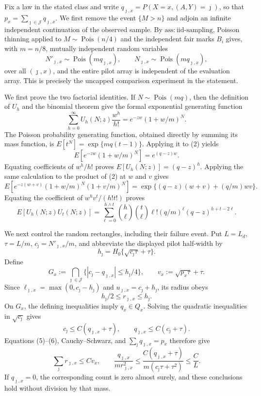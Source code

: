 Fix a law in the stated class and write \(q_{\jmath,x}=P(X=x,(A,Y)=\jmath)\), so that \(p_x=\sum_{\jmath\in\mathcal J}q_{\jmath,x}\).  We first remove the event \(\{M>n\}\) and adjoin an infinite independent continuation of the observed sample.  By \(\mathrm{ass:iid\text{-}sampling}\), Poisson thinning applied to \(M\sim\operatorname{Pois}(n/4)\) and the independent fair marks \(B_i\) gives, with \(m=n/8\), mutually independent random variables
\[
 N'_{\jmath,x}\sim\operatorname{Pois}(m q_{\jmath,x}),
 \qquad N_{\jmath,x}\sim\operatorname{Pois}(m q_{\jmath,x}),
 \tag{1}
\]
over all \((\jmath,x)\), and the entire pilot array is independent of the evaluation array.  This is precisely the uncapped comparison experiment in the statement.

We first prove the two factorial identities.  If \(N\sim\operatorname{Pois}(mq)\), then the definition of \(U_h\) and the binomial theorem give the formal exponential generating function
\[
 \sum_{h=0}^{\infty}U_h(N;z)\frac{w^h}{h!}
 =e^{-zw}(1+w/m)^N.
 \tag{2}
\]
The Poisson probability generating function, obtained directly by summing its mass function, is \(E[t^N]=\exp\{mq(t-1)\}\).  Applying it to (2) yields
\[
 E\!\left[e^{-zw}(1+w/m)^N\right]=e^{(q-z)w}.
\]
Equating coefficients of \(w^h/h!\) proves \(E[U_h(N;z)]=(q-z)^h\).  Applying the same calculation to the product of (2) at \(w\) and \(v\) gives
\[
 E\!\left[e^{-z(w+v)}(1+w/m)^N(1+v/m)^N\right]
 =\exp\{(q-z)(w+v)+(q/m)wv\}.
\]
Equating the coefficient of \(w^hv^t/(h!t!)\) proves
\[
 E[U_h(N;z)U_t(N;z)]
 =\sum_{\ell=0}^{h\wedge t}\binom h\ell\binom t\ell\ell!
 (q/m)^\ell(q-z)^{h+t-2\ell}.
 \tag{3}
\]

We next control the random rectangles, including their failure event.  Put \(L=L_d\), \(\tau=L/m\), \(c_{\jmath}=N'_{\jmath,x}/m\), and abbreviate the displayed pilot half-width by
\[
 h_{\jmath}=H_0\{\sqrt{c_{\jmath}\tau}+\tau\}.
\]
Define
\[
 G_x:=\bigcap_{\jmath\in\mathcal J}
 \{|c_{\jmath}-q_{\jmath,x}|\leq h_{\jmath}/4\},
 \qquad v_x:=\sqrt{p_x\tau}+\tau.
 \tag{4}
\]
Since \(\ell_{\jmath,x}=\max(0,c_{\jmath}-h_{\jmath})\) and \(u_{\jmath,x}=c_{\jmath}+h_{\jmath}\), its radius obeys
\[
 h_{\jmath}/2\leq r_{\jmath,x}\leq h_{\jmath}.
 \tag{5}
\]
On \(G_x\), the defining inequalities imply \(q_x\in Q_x\).  Solving the quadratic inequalities in \(\sqrt{c_{\jmath}}\) gives
\[
 c_{\jmath}\leq C(q_{\jmath,x}+\tau),
 \qquad q_{\jmath,x}\leq C(c_{\jmath}+\tau).
 \tag{6}
\]
Equations (5)--(6), Cauchy--Schwarz, and \(\sum_{\jmath}q_{\jmath,x}=p_x\) therefore give
\[
 \sum_{\jmath}r_{\jmath,x}\leq C v_x,
 \qquad
 \frac{q_{\jmath,x}}{m r_{\jmath,x}^2}
 \leq \frac{C(q_{\jmath,x}+\tau)}{m(c_{\jmath}\tau+\tau^2)}
 \leq\frac C L.
 \tag{7}
\]
If \(q_{\jmath,x}=0\), the corresponding count is zero almost surely, and these conclusions hold without division by that mass.

